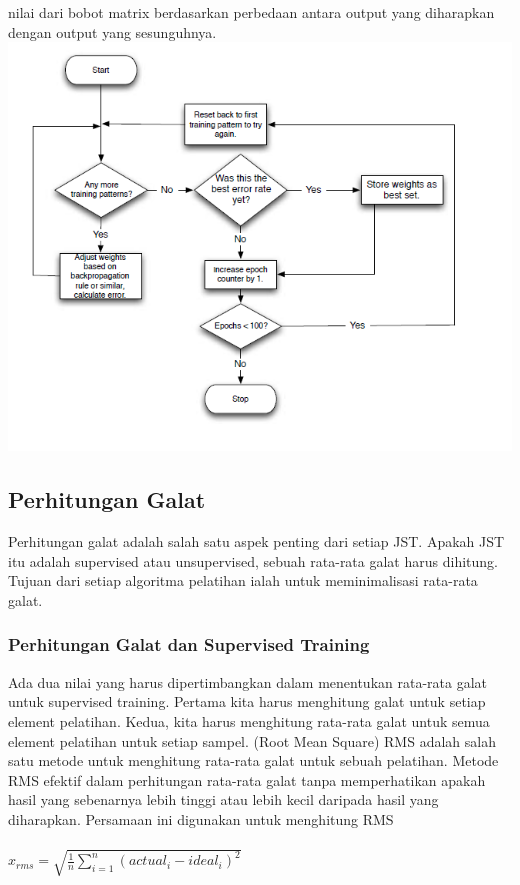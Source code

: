 \begin{enumerate}
nilai dari bobot matrix berdasarkan perbedaan antara output yang diharapkan dengan output yang sesunguhnya.\\
	\includegraphics[width=\linewidth]{Gambar/mine/supervised}
\end{enumerate}
\subsection{Perhitungan Galat}
Perhitungan galat adalah salah satu aspek penting dari setiap JST. Apakah JST itu adalah supervised atau unsupervised, sebuah rata-rata galat harus dihitung. Tujuan dari setiap algoritma pelatihan ialah untuk meminimalisasi rata-rata galat.
\subsubsection{Perhitungan Galat dan Supervised Training}
Ada dua nilai yang harus dipertimbangkan dalam menentukan rata-rata galat untuk supervised training. Pertama kita harus menghitung galat untuk setiap element pelatihan. Kedua, kita harus menghitung rata-rata galat untuk semua element pelatihan untuk setiap sampel. (Root Mean Square) RMS adalah salah satu metode untuk menghitung rata-rata galat untuk sebuah pelatihan. Metode RMS efektif dalam perhitungan rata-rata galat tanpa memperhatikan apakah hasil yang sebenarnya lebih tinggi atau lebih kecil daripada hasil yang diharapkan. Persamaan ini digunakan untuk menghitung RMS\\\\
$ x_{rms}= \sqrt{\frac{1}{n}\sum_{i=1}^{n}(actual_{i}-ideal_{i})^2} $\\\\
